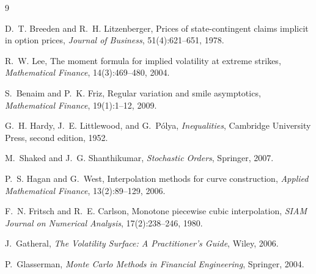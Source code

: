 \documentclass[11pt]{article}
\begin{document}
\begin{thebibliography}{9}

D.~T. Breeden and R.~H. Litzenberger,
\newblock Prices of state-contingent claims implicit in option prices,
\newblock \emph{Journal of Business}, 51(4):621--651, 1978.

R.~W. Lee,
\newblock The moment formula for implied volatility at extreme strikes,
\newblock \emph{Mathematical Finance}, 14(3):469--480, 2004.

S.~Benaim and P.~K. Friz,
\newblock Regular variation and smile asymptotics,
\newblock \emph{Mathematical Finance}, 19(1):1--12, 2009.

G.~H. Hardy, J.~E. Littlewood, and G.~P\'olya,
\newblock \emph{Inequalities},
\newblock Cambridge University Press, second edition, 1952.

M.~Shaked and J.~G. Shanthikumar,
\newblock \emph{Stochastic Orders},
\newblock Springer, 2007.

P.~S. Hagan and G.~West,
\newblock Interpolation methods for curve construction,
\newblock \emph{Applied Mathematical Finance}, 13(2):89--129, 2006.

F.~N. Fritsch and R.~E. Carlson,
\newblock Monotone piecewise cubic interpolation,
\newblock \emph{SIAM Journal on Numerical Analysis}, 17(2):238--246, 1980.

J.~Gatheral,
\newblock \emph{The Volatility Surface: A Practitioner's Guide},
\newblock Wiley, 2006.

P.~Glasserman,
\newblock \emph{Monte Carlo Methods in Financial Engineering},
\newblock Springer, 2004.

\end{thebibliography}
\end{document}

